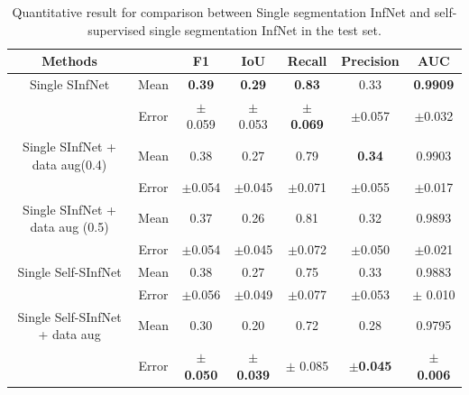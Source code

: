 \begin{table}[!h]
	\centering
	\begin{tabular}{| c | c || c c c c c ||}
		\hline
		Methods & & F1 & IoU & Recall & Precision & AUC \\ \hline
		Single SInfNet &  Mean & \textbf{0.39} & \textbf{0.29} & \textbf{0.83} & 0.33 & \textbf{0.9909} \\ \cline{2-7}
		& Error & $\pm$ 0.059 & $\pm$ 0.053 & $\pm$ \textbf{0.069} & $\pm$0.057  & $\pm$0.032 \\ \hline
		Single SInfNet + data aug(0.4) &  Mean & 0.38 & 0.27 & 0.79 & \textbf{0.34} & 0.9903 \\ \cline{2-7}
		& Error & $\pm$0.054  & $\pm$0.045  &$\pm$0.071 &$\pm$0.055 &$\pm$0.017 \\ \hline
		Single SInfNet + data aug (0.5) &  Mean & 0.37 & 0.26 & 0.81 & 0.32 & 0.9893 \\ \cline{2-7}
		& Error &$\pm$0.054 &$\pm$0.045 &$\pm$0.072 &$\pm$0.050 &  $\pm$0.021  \\ \hline \hline
		Single Self-SInfNet &  Mean & 0.38 & 0.27 & 0.75 & 0.33 & 0.9883  \\ \cline{2-7}
		& Error & $\pm$0.056 & $\pm$0.049 &$\pm$0.077  & $\pm$0.053 & $\pm$  0.010 \\ \hline
		Single Self-SInfNet + data aug &  Mean & 0.30 & 0.20 & 0.72 & 0.28 &  0.9795 \\ \cline{2-7}
		& Error & $\pm$ \textbf{0.050}  & $\pm$  \textbf{0.039} & $\pm$ 0.085 & $\pm$\textbf{0.045} & $\pm$ \textbf{0.006}  \\ \hline
	\end{tabular}
	\caption{Quantitative result for comparison between Single segmentation InfNet and self-supervised single segmentation InfNet in the test set.}
	\label{tab:single}
\end{table}


